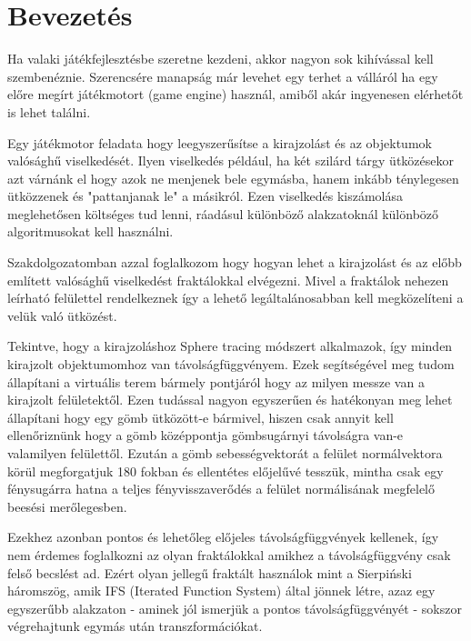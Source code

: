 \chapter{Bevezetés} %
\label{ch:intro}

Ha valaki játékfejlesztésbe szeretne kezdeni, akkor nagyon sok kihívással kell szembenéznie. Szerencsére manapság már levehet egy terhet a válláról ha egy előre megírt játékmotort (game engine) használ, amiből akár ingyenesen elérhetőt is lehet találni.

Egy játékmotor feladata hogy leegyszerűsítse a kirajzolást és az objektumok valósághű viselkedését. Ilyen viselkedés például, ha két szilárd tárgy ütközésekor azt várnánk el hogy azok ne menjenek bele egymásba, hanem inkább ténylegesen ütközzenek és "pattanjanak le" a másikról. Ezen viselkedés kiszámolása meglehetősen költséges tud lenni, ráadásul különböző alakzatoknál különböző algoritmusokat kell használni.

Szakdolgozatomban azzal foglalkozom hogy hogyan lehet a kirajzolást és az előbb említett valósághű viselkedést fraktálokkal elvégezni. Mivel a fraktálok nehezen leírható felülettel rendelkeznek így a lehető legáltalánosabban kell megközelíteni a velük való ütközést. 

Tekintve, hogy a kirajzoláshoz Sphere tracing módszert alkalmazok, így minden kirajzolt objektumomhoz van távolságfüggvényem. Ezek segítségével meg tudom állapítani a virtuális terem bármely pontjáról hogy az milyen messze van a kirajzolt felületektől. Ezen tudással nagyon egyszerűen és hatékonyan meg lehet állapítani hogy egy gömb ütközött-e bármivel, hiszen csak annyit kell ellenőriznünk hogy a gömb középpontja gömbsugárnyi távolságra van-e valamilyen felülettől. Ezután a gömb sebességvektorát a felület normálvektora körül megforgatjuk 180 fokban és ellentétes előjelűvé tesszük, mintha csak egy fénysugárra hatna a teljes fényvisszaverődés a felület normálisának megfelelő beesési merőlegesben.

Ezekhez azonban pontos és lehetőleg előjeles távolságfüggvények kellenek, így nem érdemes foglalkozni az olyan fraktálokkal amikhez a távolságfüggvény csak felső becslést ad. Ezért olyan jellegű fraktált használok mint a Sierpiński háromszög, amik IFS (Iterated Function System) által jönnek létre, azaz egy egyszerűbb alakzaton - aminek jól ismerjük a pontos távolságfüggvényét - sokszor végrehajtunk egymás után transzformációkat.
